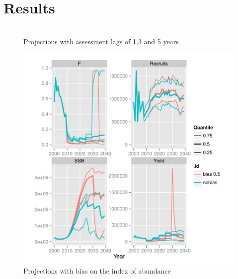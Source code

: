 \documentclass[a4paper]{article}
\begin{document}
\section{Results}

\begin{figure}[H]
\centering
\includegraphics{MSE-004}
\caption{Projections with assessment lags of 1,3 and 5 years}
\label{fig:lags}
\end{figure}
 
\begin{figure}[H]
\centering
\includegraphics{MSE-005}
\caption{Projections with bias on the index of abundance}
\label{fig:srvBias}
\end{figure}
\end{document}
